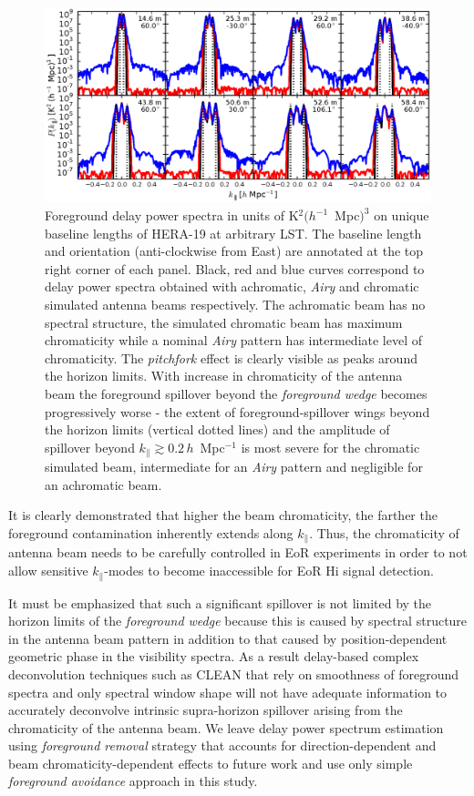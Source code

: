 \documentclass[preprint2,iop,numberedappendix,twocolappendix,appendixfloats]{emulateapj}
\begin{document}
\begin{figure}[htb]
  \centering
  \includegraphics[width=\linewidth]{asm_foreground_eor_beam_chromaticity_fullband_bhw2.0.eps}
  \caption{Foreground delay power spectra in units of K$^2 (h^{-1}$~Mpc$)^3$ on unique baseline lengths of HERA-19 at arbitrary LST. The baseline length and orientation (anti-clockwise from East) are annotated at the top right corner of each panel. Black, red and blue curves correspond to delay power spectra obtained with achromatic, {\it Airy} and chromatic simulated antenna beams respectively. The achromatic beam has no spectral structure, the simulated chromatic beam has maximum chromaticity while a nominal {\it Airy} pattern has intermediate level of chromaticity. The {\it pitchfork} effect is clearly visible as peaks around the horizon limits. With increase in chromaticity of the antenna beam the foreground spillover beyond the {\it foreground wedge} becomes progressively worse - the extent of foreground-spillover wings beyond the horizon limits (vertical dotted lines) and the amplitude of spillover beyond $k_\parallel\gtrsim 0.2\,h$~Mpc$^{-1}$ is most severe for the chromatic simulated beam, intermediate for an {\it Airy} pattern and negligible for an achromatic beam.}
  \label{fig:asm-dps-beam-chromaticity-baselines}
\end{figure}

It is clearly demonstrated that higher the beam chromaticity, the farther the foreground contamination inherently extends along $k_\parallel$. Thus, the chromaticity of antenna beam needs to be carefully controlled in EoR experiments in order to not allow sensitive $k_\parallel$-modes to become inaccessible for EoR H{\sc i} signal detection.

It must be emphasized that such a significant spillover is not limited by the horizon limits of the {\it foreground wedge} because this is caused by spectral structure in the antenna beam pattern in addition to that caused by position-dependent geometric phase in the visibility spectra. As a result delay-based complex deconvolution techniques such as CLEAN \citep{tay99,par09,par12b} that rely on smoothness of foreground spectra and only spectral window shape will not have adequate information to accurately deconvolve intrinsic supra-horizon spillover arising from the chromaticity of the antenna beam. We leave delay power spectrum estimation using {\it foreground removal} strategy that accounts for direction-dependent and beam chromaticity-dependent effects to future work and use only simple {\it foreground avoidance} approach in this study.
\end{document}
